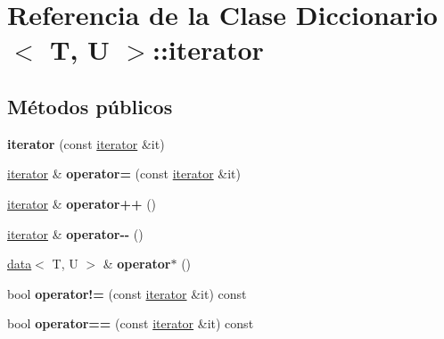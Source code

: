 \hypertarget{classDiccionario_1_1iterator}{}\section{Referencia de la Clase Diccionario$<$ T, U $>$\+:\+:iterator}
\label{classDiccionario_1_1iterator}
\subsection*{Métodos públicos}
\begin{DoxyCompactItemize}
\item 
\mbox{\label{classDiccionario_1_1iterator_aad7992e257dbf3011d658260417c2a3d}} 
{\bfseries iterator} (const \hyperlink{classDiccionario_1_1iterator}{iterator} \&it)
\item 
\mbox{\label{classDiccionario_1_1iterator_a14cea8ab13a78b6b0e7db7da306a4f93}} 
\hyperlink{classDiccionario_1_1iterator}{iterator} \& {\bfseries operator=} (const \hyperlink{classDiccionario_1_1iterator}{iterator} \&it)
\item 
\mbox{\label{classDiccionario_1_1iterator_abb32bfe303f4364916912fe77e17c863}} 
\hyperlink{classDiccionario_1_1iterator}{iterator} \& {\bfseries operator++} ()
\item 
\mbox{\label{classDiccionario_1_1iterator_a62013ea12056acd2d47d61be07b95cbe}} 
\hyperlink{classDiccionario_1_1iterator}{iterator} \& {\bfseries operator-\/-\/} ()
\item 
\mbox{\label{classDiccionario_1_1iterator_a73b51a8a547d05fa9b45ecc6043bf456}} 
\hyperlink{structdata}{data}$<$ T, U $>$ \& {\bfseries operator$\ast$} ()
\item 
\mbox{\label{classDiccionario_1_1iterator_a6881f532499453c5604e60ff046a49b4}} 
bool {\bfseries operator!=} (const \hyperlink{classDiccionario_1_1iterator}{iterator} \&it) const
\item 
\mbox{\label{classDiccionario_1_1iterator_af6eab879c4a70a357f089a8498c9d7f9}} 
bool {\bfseries operator==} (const \hyperlink{classDiccionario_1_1iterator}{iterator} \&it) const
\end{DoxyCompactItemize}
